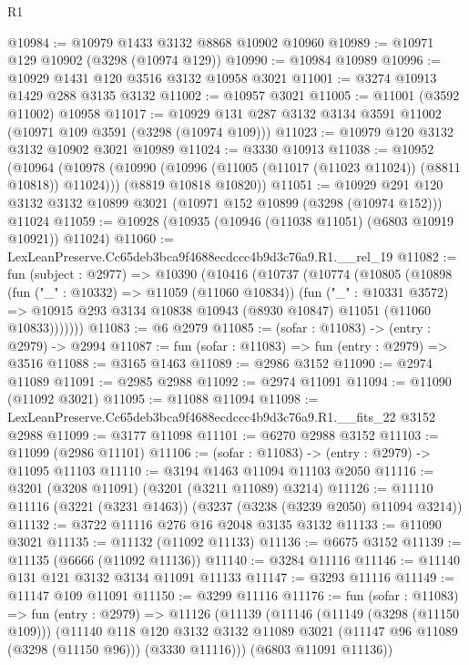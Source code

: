\begin{lexlean}{R1}
\begin{coremodule}
@10984 := @10979 @1433 @3132 @8868 @10902 @10960
@10989 := @10971 @129 @10902 (@3298 (@10974 @129))
@10990 := @10984 @10989
@10996 := @10929 @1431 @120 @3516 @3132 @10958 @3021
@11001 := @3274 @10913 @1429 @288 @3135 @3132
@11002 := @10957 @3021
@11005 := @11001 (@3592 @11002) @10958
@11017 := @10929 @131 @287 @3132 @3134 @3591 @11002 (@10971 @109 @3591 (@3298 (@10974 @109)))
@11023 := @10979 @120 @3132 @3132 @10902 @3021 @10989
@11024 := @3330 @10913
@11038 := @10952
    (@10964
      (@10978 (@10990 (@10996 (@11005 (@11017 (@11023 @11024)) (@8811 @10818)) @11024)))
      (@8819 @10818 @10820))
@11051 := @10929
    @291
    @120
    @3132
    @3132
    @10899
    @3021
    (@10971 @152 @10899 (@3298 (@10974 @152)))
    @11024
@11059 := @10928 (@10935 (@10946 (@11038 @11051) (@6803 @10919 @10921)) @11024)
@11060 := LexLeanPreserve.Cc65deb3bca9f4688ecdccc4b9d3c76a9.R1.__rel_19
@11082 := fun (subject : @2977) =>
  @10390
    (@10416
      (@10737
        (@10774
          (@10805
            (@10898
              (fun ("_" : @10332) => @11059 (@11060 @10834))
              (fun ("_" : @10331 @3572) =>
              @10915 @293 @3134 @10838 @10943 (@8930 @10847) @11051 (@11060 @10833)))))))
@11083 := @6 @2979
@11085 := (sofar : @11083) -> (entry : @2979) -> @2994
@11087 := fun (sofar : @11083) => fun (entry : @2979) => @3516
@11088 := @3165 @1463
@11089 := @2986 @3152
@11090 := @2974 @11089
@11091 := @2985 @2988
@11092 := @2974 @11091
@11094 := @11090 (@11092 @3021)
@11095 := @11088 @11094
@11098 := LexLeanPreserve.Cc65deb3bca9f4688ecdccc4b9d3c76a9.R1.__fits_22 @3152 @2988
@11099 := @3177 @11098
@11101 := @6270 @2988 @3152
@11103 := @11099 (@2986 @11101)
@11106 := (sofar : @11083) -> (entry : @2979) -> @11095 @11103
@11110 := @3194 @1463 @11094 @11103 @2050
@11116 := @3201 (@3208 @11091) (@3201 (@3211 @11089) @3214)
@11126 := @11110 @11116 (@3221 (@3231 @1463)) (@3237 (@3238 (@3239 @2050) @11094 @3214))
@11132 := @3722 @11116 @276 @16 @2048 @3135 @3132
@11133 := @11090 @3021
@11135 := @11132 (@11092 @11133)
@11136 := @6675 @3152
@11139 := @11135 (@6666 (@11092 @11136))
@11140 := @3284 @11116
@11146 := @11140 @131 @121 @3132 @3134 @11091 @11133
@11147 := @3293 @11116
@11149 := @11147 @109 @11091
@11150 := @3299 @11116
@11176 := fun (sofar : @11083) =>
  fun (entry : @2979) =>
  @11126
    (@11139
      (@11146
        (@11149 (@3298 (@11150 @109)))
        (@11140
          @118
          @120
          @3132
          @3132
          @11089
          @3021
          (@11147 @96 @11089 (@3298 (@11150 @96)))
          (@3330 @11116)))
      (@6803 @11091 @11136))

\end{coremodule}
\end{lexlean}
